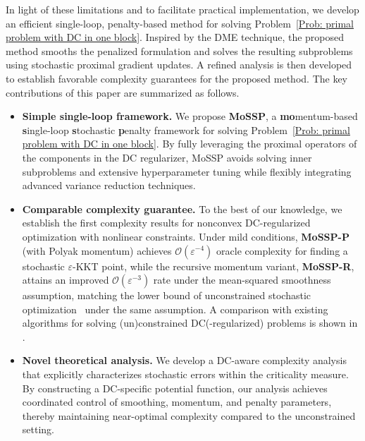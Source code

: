 \documentclass{article}
\theoremstyle{plain}
\theoremstyle{definition}
\theoremstyle{remark}
\newcommand{\calO}{\mathcal{O}}
\numberwithin{equation}{section}
\begin{document}
In light of these limitations and to facilitate practical implementation, we develop an efficient single-loop, penalty-based method for solving Problem~\eqref{Prob: primal problem with DC in one block}. Inspired by the DME technique, the proposed method smooths the penalized formulation and solves the resulting subproblems using stochastic proximal gradient updates. A refined analysis is then developed to establish favorable complexity guarantees for the proposed method. The key contributions of this paper are summarized as follows.
\begin{itemize}
\item[$\blacktriangleright$]\textbf{Simple single-loop framework.} We propose \textbf{MoSSP}, a \textbf{mo}mentum-based \textbf{s}ingle-loop \textbf{s}tochastic
\textbf{p}enalty framework for solving Problem~\eqref{Prob: primal problem with DC in one block}. By fully leveraging the proximal operators of the components in the DC regularizer, MoSSP avoids solving inner subproblems and extensive hyperparameter tuning while flexibly integrating advanced variance reduction techniques.
\item[$\blacktriangleright$]\textbf{Comparable complexity guarantee.} To the best of our knowledge, we establish the first complexity results for nonconvex DC-regularized optimization with nonlinear constraints. Under mild conditions, \textbf{MoSSP-P} (with Polyak momentum) achieves $\calO(\varepsilon^{-4})$ oracle complexity for finding a stochastic $\varepsilon$-KKT point, while the recursive momentum variant, \textbf{MoSSP-R}, attains an improved $\calO(\varepsilon^{-3})$ rate under the mean-squared smoothness assumption, matching the lower bound of unconstrained stochastic optimization~\cite{arjevani2023lower} under the same assumption. A comparison with existing algorithms for solving (un)constrained DC(-regularized) problems is shown in .
\item[$\blacktriangleright$] \textbf{Novel theoretical analysis.} We develop a DC-aware complexity analysis that explicitly characterizes stochastic errors within the criticality measure. By constructing a DC-specific potential function, our analysis achieves coordinated control of smoothing, momentum, and penalty parameters, thereby maintaining near-optimal complexity compared to the unconstrained setting.
\end{itemize}
\end{document}
